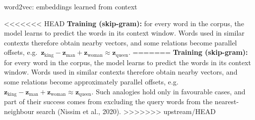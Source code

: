 \begin{frame}{word2vec: embeddings learned from context}

\vspace{0.3em}
\begingroup\footnotesize\raggedright
<<<<<<< HEAD
\textbf{Training (skip-gram):} for every word in the corpus, the model learns to predict the words in its context window. Words used in similar contexts therefore obtain nearby vectors, and some relations become parallel offsets, e.g.\ $\mathbf{z}_{\text{king}} - \mathbf{z}_{\text{man}} + \mathbf{z}_{\text{woman}} \approx \mathbf{z}_{\text{queen}}$.
=======
\textbf{Training (skip-gram):} for every word in the corpus, the model learns to predict the words in its context window. Words used in similar contexts therefore obtain nearby vectors, and some relations become approximately parallel offsets, e.g.\ $\mathbf{z}_{\text{king}} - \mathbf{z}_{\text{man}} + \mathbf{z}_{\text{woman}} \approx \mathbf{z}_{\text{queen}}$. Such analogies hold only in favourable cases, and part of their success comes from excluding the query words from the nearest-neighbour search (Nissim et al., 2020).
>>>>>>> upstream/HEAD
\par\endgroup
\coursefooter
\end{frame}

